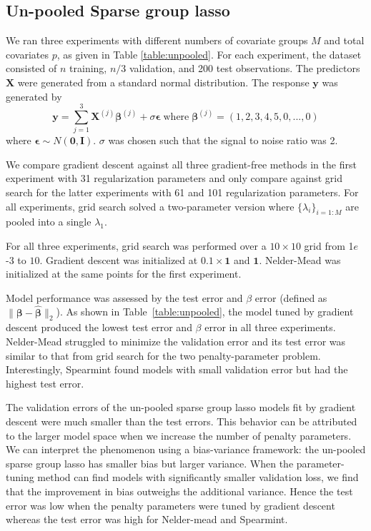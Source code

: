 \documentclass[12pt]{article}
\begin{document}
\subsection{Un-pooled Sparse group lasso}\label{sec:simulation_sgl}
We ran three experiments with different numbers of covariate groups $M$ and total covariates $p$, as given in Table \ref{table:unpooled}. For each experiment, the dataset consisted of $n$ training, $n/3$ validation, and 200 test observations. The predictors $\boldsymbol X$ were generated from a standard normal distribution. The response $\boldsymbol y$ was generated by
\begin{equation}
\boldsymbol y = \sum\limits_{j=1}^3 \boldsymbol X^{(j)} \boldsymbol \beta^{(j)} + \sigma \boldsymbol \epsilon \; \text{where} \; \boldsymbol \beta^{(j)} = (1, 2, 3, 4, 5, 0, ..., 0)
\end{equation}
where $\boldsymbol \epsilon \sim N(\boldsymbol 0, \boldsymbol I)$. $\sigma$ was chosen such that the signal to noise ratio was 2. 

We compare gradient descent against all three gradient-free methods in the first experiment with 31 regularization parameters and only compare against grid search for the latter experiments with 61 and 101 regularization parameters. For all experiments, grid search solved a two-parameter version where $\{\lambda_i\}_{i=1:M}$ are pooled into a single $\lambda_1$.

For all three experiments, grid search was performed over a $10 \times 10$ grid from 1$e$-3 to $10$. Gradient descent was initialized at $0.1 \times \boldsymbol 1$ and $\boldsymbol 1$. Nelder-Mead was initialized at the same points for the first experiment.

Model performance was assessed by the test error and $\beta$ error (defined as $\| \boldsymbol \beta - \hat {\boldsymbol \beta} \|_2$). As shown in Table~\ref{table:unpooled}, the model tuned by gradient descent produced the lowest test error and $\beta$ error in all three experiments. Nelder-Mead struggled to minimize the validation error and its test error was similar to that from grid search for the two penalty-parameter problem. Interestingly, Spearmint found models with small validation error but had the highest test error.

The validation errors of the un-pooled sparse group lasso models fit by gradient descent were much smaller than the test errors. This behavior can be attributed to the larger model space when we increase the number of penalty parameters. We can interpret the phenomenon using a bias-variance framework: the un-pooled sparse group lasso has smaller bias but larger variance. When the parameter-tuning method can find models with significantly smaller validation loss, we find that the improvement in bias outweighs the additional variance. Hence the test error was low when the penalty parameters were tuned by gradient descent whereas the test error was high for Nelder-mead and Spearmint.
\end{document}
